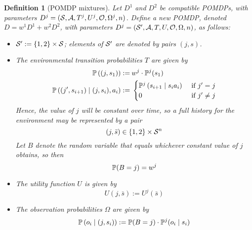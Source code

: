 \documentclass{article}  %
\newcommand{\seq}{\bar}
\newcommand{\bool}{B}
\newtheorem{definition}[theorem]{Definition}
\begin{document}
\begin{definition}[POMDP mixtures]\label{defn:mixture} Let $D^1$ and $D^2$ be compatible POMDPs, with parameters 
$D^j = (\mathcal{S},\mathcal{A},T^j, U^j, \mathcal{O}, \Omega^j, n)$.  Define a new POMDP, denoted $D=w^1D^1 + w^2D^2$, with parameters 
$D^j = (\mathcal{S}',\mathcal{A},T, U, \mathcal{O}, \Omega, n)$, as follows:
\begin{itemize}
\item $\mathcal{S}':=\{1,2\}\times\mathcal{S}$; elements of $\mathcal{S}'$ are denoted by pairs $(j,s)$.
\item The environmental transition probabilities $T$ are given by
\begin{align*}
\mathbb{P}\left((j,s_1)\right) :=&\: w^j\cdot \mathbb{P}^j(s_1)\\
\mathbb{P}\left((j',s_{i+1}) \mid (j,s_i), a_i \right) :=&\;
\begin{cases}
\mathbb{P}^j\left(s_{i+1} \mid s_ia_i\right) &\mbox{ if $j'=j$}\\
0 & \mbox { if $j'\neq j$}
\end{cases}
\end{align*}
Hence, the value of $j$ will be constant over time, so a full history for the environment may be represented by a pair 
\[
(j,\seq s)\in\{1,2\}\times\Ss^n
\]
Let $\bool $ denote the random variable that equals whichever constant value of $j$ obtains, so then
\[
\PP(\bool =j) = w^j
\]
\item The utility function $U$ is given by
\[
U(j,\seq s) := U^j(\seq s)
\]
\item The observation probabilities $\Omega$ are given by
\[
\PP\left(o_i \mid (j,s_i)\right) := \PP(\bool =j) \cdot \PP^j(o_i \mid s_i)
\]
\end{itemize}

\end{definition}
\end{document}
